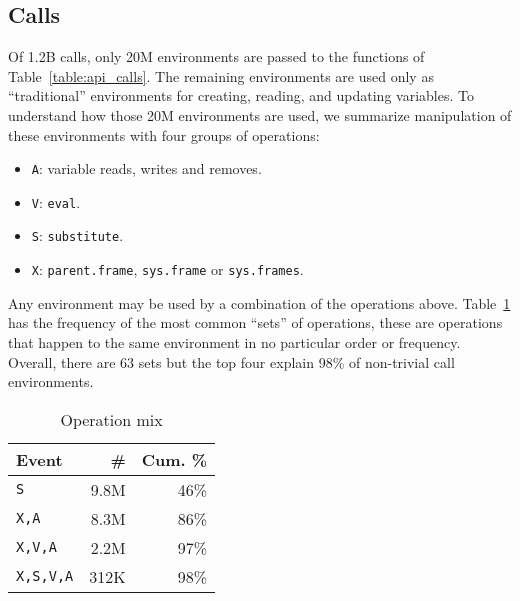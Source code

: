 \documentclass[10pt,sigplan,authorversion=true]{acmart}
\renewcommand{\c}[1]{\lstinline |#1|\xspace}
\newcommand{\eval}{\c{eval}}
\newcommand{\substitute}{\c{substitute}}
\begin{document}
\subsection{Calls}

Of 1.2B calls, only 20M environments are passed to the functions of
Table~\ref{table:api_calls}. The remaining environments are used only as
``traditional'' environments for creating, reading, and updating variables. To
understand how those 20M environments are used, we summarize manipulation
of these environments with four groups of operations:

\begin{itemize}
\item \texttt{A}: variable reads, writes and removes.
\item \texttt{V}: \eval.
\item \texttt{S}: \substitute.
\item \texttt{X}: \c{parent.frame}, \c{sys.frame} or \c{sys.frames}.
\end{itemize}

\noindent
Any environment may be used by a combination of the operations above.
Table~\ref{table:call_env_seq} has the frequency of the most common ``sets'' of
operations, these are operations that happen to the same environment in no
particular order or frequency. Overall, there are 63 sets but the top four
explain 98\% of non-trivial call environments.

\begin{table}[!h]  \small
  \caption{Operation mix} \label{table:call_env_seq}  \centering
  \begin{tabular}{lrr}    \toprule
    \textbf{Event}&\textbf{\#}&\textbf{Cum. \%}\\\midrule
    \texttt{S}&          9.8M & 46\%\\
    \texttt{X,A}&        8.3M & 86\%\\
    \texttt{X,V,A}&      2.2M & 97\%\\
    \texttt{X,S,V,A}   & 312K & 98\%\\\bottomrule
  \end{tabular}
\end{table}
\end{document}
